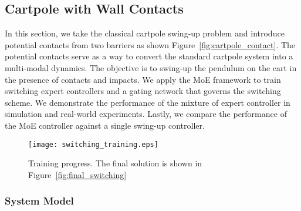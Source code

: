 \subsection{Cartpole with Wall Contacts}
\label{ssec:cartpole_with_walls}

In this section, we take the classical cartpole swing-up problem and introduce
potential contacts from two barriers as shown Figure~\ref{fig:cartpole_contact}. 
%
The potential contacts serve as a way to convert the standard cartpole system
into a multi-modal dynamics.
%
The objective is to swing-up the pendulum on the cart in the presence of
contacts and impacts.
%
We apply the MoE framework to train switching expert controllers and a gating
network that governs the switching scheme.
%
We demonstrate the performance of the mixture of expert controller in
simulation and real-world experiments.
%
Lastly, we compare the performance of the MoE controller against
a single swing-up controller. 
\begin{figure}[tb]
    \centering
    \texttt{[image: switching\_training.eps]}
    \caption{Training progress. The final solution is shown in
    Figure~\ref{fig:final_switching}}
    \label{fig:switching_training}
\end{figure}

\subsubsection{System Model}
\label{sssec:cartpole_model}


